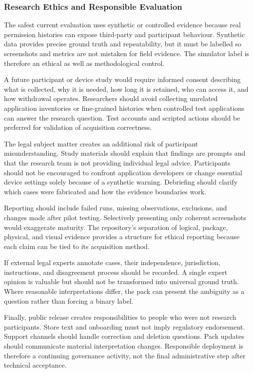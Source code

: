 \subsubsection{Research Ethics and Responsible Evaluation}

The safest current evaluation uses synthetic or controlled evidence because real permission histories can expose third-party and participant behaviour. Synthetic data provides precise ground truth and repeatability, but it must be labelled so screenshots and metrics are not mistaken for field evidence. The simulator label is therefore an ethical as well as methodological control.

A future participant or device study would require informed consent describing what is collected, why it is needed, how long it is retained, who can access it, and how withdrawal operates. Researchers should avoid collecting unrelated application inventories or fine-grained histories when controlled test applications can answer the research question. Test accounts and scripted actions should be preferred for validation of acquisition correctness.

The legal subject matter creates an additional risk of participant misunderstanding. Study materials should explain that findings are prompts and that the research team is not providing individual legal advice. Participants should not be encouraged to confront application developers or change essential device settings solely because of a synthetic warning. Debriefing should clarify which cases were fabricated and how the evidence boundaries work.

Reporting should include failed runs, missing observations, exclusions, and changes made after pilot testing. Selectively presenting only coherent screenshots would exaggerate maturity. The repository's separation of logical, package, physical, and visual evidence provides a structure for ethical reporting because each claim can be tied to its acquisition method.

If external legal experts annotate cases, their independence, jurisdiction, instructions, and disagreement process should be recorded. A single expert opinion is valuable but should not be transformed into universal ground truth. Where reasonable interpretations differ, the pack can present the ambiguity as a question rather than forcing a binary label.

Finally, public release creates responsibilities to people who were not research participants. Store text and onboarding must not imply regulatory endorsement. Support channels should handle correction and deletion questions. Pack updates should communicate material interpretation changes. Responsible deployment is therefore a continuing governance activity, not the final administrative step after technical acceptance.

